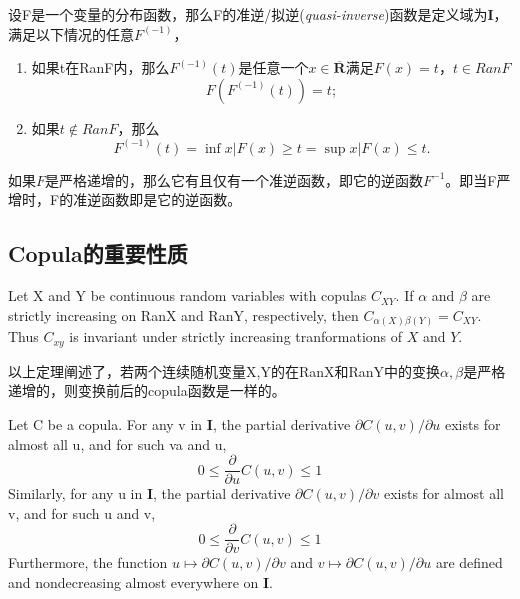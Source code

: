 \begin{definition}
    设F是一个变量的分布函数，那么F的准逆/拟逆(\emph{quasi-inverse})函数是定义域为$\mathbf{I}$，满足以下情况的任意$F^{(-1)}$，
    \begin{enumerate}
        \item 如果t在RanF内，那么$F^{(-1)}(t)$是任意一个$x \in \overline{\mathbf{R}}$满足$F(x)=t$，$t \in RanF$
            \begin{equation*}
                F(F^{(-1)}(t)) = t;
            \end{equation*}
        \item 如果$t \notin RanF$，那么
            \begin{equation*}
                F^{(-1)}(t) = \inf{x | F(x) \geq t} = \sup{x|F(x) \leq t}.
            \end{equation*}
    \end{enumerate}
    如果$F$是严格递增的，那么它有且仅有一个准逆函数，即它的逆函数$F^{-1}$。即当F严增时，F的准逆函数即是它的逆函数。
    \label{def-quasiinverse}
\end{definition}

\subsection{Copula的重要性质}
\begin{theorem}
    Let X and Y be continuous random variables with copulas $C_{XY}$. If $\alpha$ and $\beta$ are strictly increasing on RanX and RanY, respectively, then $C_{\alpha(X)\beta(Y)} = C_{XY}$. Thus \textcolor[rgb]{1,0,0}{$C_{xy}$ is invariant under strictly increasing tranformations of $X$ and $Y$}.
    \label{thr2.4.3}
\end{theorem}
以上定理阐述了，若两个连续随机变量X,Y的在RanX和RanY中的变换$\alpha,\beta$是严格递增的，则变换前后的copula函数是一样的。
\begin{theorem}
    Let C be a copula. For any v in $\mathbf{I}$, the partial derivative $\partial C(u,v)/\partial u$ exists for almost all u, and for such va and u,
    \begin{equation}
        0 \leq \dfrac{\partial}{\partial u}C(u,v) \leq 1
        \label{eq-partialu}
    \end{equation}
    Similarly, for any u in $\mathbf{I}$, the partial derivative $\partial C(u,v)/\partial v$ exists for almost all v, and for such u and v,
    \begin{equation}
        0\leq \dfrac{\partial}{\partial v} C(u,v) \leq 1
        \label{eq-partialv}
    \end{equation}
    Furthermore, the function $u \mapsto \partial C(u,v)/\partial v$ and $v\mapsto \partial C(u,v)/\partial u$ are defined and nondecreasing almost everywhere on $\mathbf{I}$.
    \label{thr-2.2.7}
\end{theorem}

